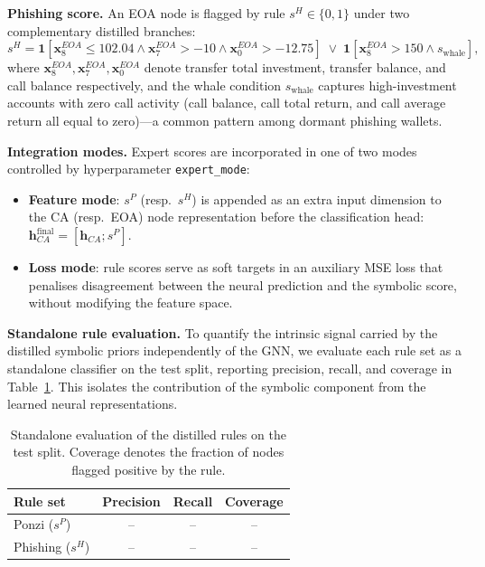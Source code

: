 \documentclass[conference]{IEEEtran}
\begin{document}
\medskip\noindent\textbf{Phishing score.}
An EOA node is flagged by rule $s^H\!\in\!\{0,1\}$ under two
complementary distilled branches:
\begin{equation}
  s^H = \mathbf{1}\!\left[
    \mathbf{x}^{EOA}_{8} \le 102.04
    \wedge \mathbf{x}^{EOA}_{7} > {-10}
    \wedge \mathbf{x}^{EOA}_{0} > {-12.75}
  \right]
  \;\vee\;
  \mathbf{1}\!\left[
    \mathbf{x}^{EOA}_{8} > 150 \wedge s_{\mathrm{whale}}
  \right],
\end{equation}
where $\mathbf{x}^{EOA}_{8},\mathbf{x}^{EOA}_{7},\mathbf{x}^{EOA}_{0}$
denote transfer total investment, transfer balance, and call balance
respectively, and the whale condition $s_{\mathrm{whale}}$ captures
high-investment accounts with zero call activity (call balance, call
total return, and call average return all equal to zero)---a common
pattern among dormant phishing wallets.

\medskip\noindent\textbf{Integration modes.}
Expert scores are incorporated in one of two modes controlled by
hyperparameter \texttt{expert\_mode}:
\begin{itemize}
\item \textbf{Feature mode}: $s^P$ (resp.\ $s^H$) is appended as an
  extra input dimension to the CA (resp.\ EOA) node representation
  before the classification head:
  $\mathbf{h}^{\mathrm{final}}_{CA} = [\mathbf{h}_{CA}; s^P]$.
\item \textbf{Loss mode}: rule scores serve as soft targets in an
  auxiliary MSE loss that penalises disagreement between the neural
  prediction and the symbolic score, without modifying the feature
  space.
\end{itemize}

\medskip\noindent\textbf{Standalone rule evaluation.}
To quantify the intrinsic signal carried by the distilled symbolic
priors independently of the GNN, we evaluate each rule set as a
standalone classifier on the test split, reporting precision, recall,
and coverage in Table~\ref{tab:rules}. This isolates the contribution
of the symbolic component from the learned neural representations.

\begin{table}[h]
\centering
\caption{Standalone evaluation of the distilled rules on the test
split. Coverage denotes the fraction of nodes flagged positive by the
rule.}
\label{tab:rules}
\begin{tabular}{@{}lccc@{}}
\toprule
Rule set & Precision & Recall & Coverage \\
\midrule
Ponzi ($s^P$)    & -- & -- & -- \\
Phishing ($s^H$) & -- & -- & -- \\
\bottomrule
\end{tabular}
\end{table}
\end{document}
